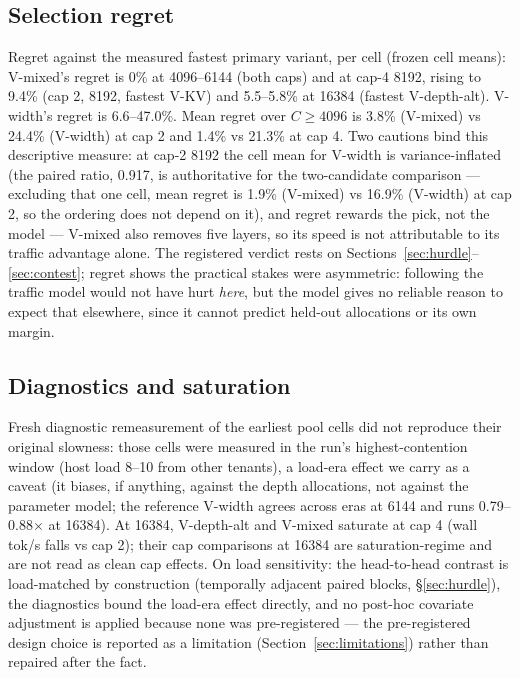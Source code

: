 \documentclass[11pt]{article}
\begin{document}
\subsection{Selection regret}
\label{sec:regret}
Regret against the measured fastest primary variant, per cell
(frozen cell means): V-mixed's regret is 0\% at 4096--6144 (both
caps) and at cap-4 8192, rising to 9.4\% (cap 2, 8192, fastest
V-KV) and 5.5--5.8\% at 16384 (fastest V-depth-alt). V-width's
regret is 6.6--47.0\%. Mean regret over $C\geq4096$ is 3.8\%
(V-mixed) vs 24.4\% (V-width) at cap 2 and 1.4\% vs 21.3\% at
cap 4. Two cautions bind this descriptive measure: at cap-2 8192
the cell mean for V-width is variance-inflated (the paired ratio,
0.917, is authoritative for the two-candidate comparison ---
excluding that one cell, mean regret is 1.9\% (V-mixed) vs
16.9\% (V-width) at cap 2, so the ordering does not depend on it),
and
regret rewards the pick, not the model --- V-mixed also removes
five layers, so its speed is not attributable to its traffic
advantage alone. The registered verdict rests on
Sections~\ref{sec:hurdle}--\ref{sec:contest}; regret shows the
practical stakes were asymmetric: following the traffic model
would not have hurt \emph{here}, but the model gives no reliable
reason to expect that elsewhere, since it cannot predict held-out
allocations or its own margin.

\subsection{Diagnostics and saturation}
\label{sec:diagnostics}
Fresh diagnostic remeasurement of the earliest pool cells did not
reproduce their original slowness: those cells were measured in
the run's highest-contention window (host load 8--10 from other
tenants), a load-era effect we carry as a caveat (it biases, if
anything, against the depth allocations, not against the
parameter model; the reference V-width agrees across eras at 6144
and runs 0.79--0.88$\times$ at 16384). At 16384, V-depth-alt and
V-mixed saturate at cap 4 (wall tok/s falls vs cap 2); their cap
comparisons at 16384 are saturation-regime and are not read as
clean cap effects. On load sensitivity: the head-to-head contrast
is load-matched by construction (temporally adjacent paired
blocks, \S\ref{sec:hurdle}), the diagnostics bound the load-era
effect directly, and no post-hoc covariate adjustment is applied
because none was pre-registered --- the pre-registered design
choice is reported as a limitation (Section~\ref{sec:limitations}) rather than
repaired after the fact.
\end{document}
